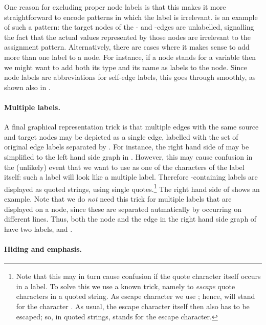 One reason for excluding proper node labels is that this makes it more
straightforward to encode patterns in which the label is irrelevant.
 is an example of such a pattern: the target nodes of the
\xx- and \yy-edges are unlabelled, signalling the fact that the actual values
represented by those nodes are irrelevant to the assignment
pattern. Alternatively, there are cases where it makes sense to add more than one label
to a node. For instance, if a node stands for a variable then we might want to
add both its type and its name as labels to the node. Since node labels are
abbreviations for self-edge labels, this goes through smoothly, as shown also
in .

\paragraph{Multiple labels.}

A final graphical representation trick is that multiple edges with the same
source and target nodes may be depicted as a single edge, labelled with the set
of original edge labels separated by \quo{\sepChar}. For instance, the right
hand side of  may be simplified to the left hand side
graph in . However, this may cause confusion in the
(unlikely) event that we want to use \quo{\sepChar} as one of the characters of
the label itself: such a label will look like a multiple label. Therefore
\quo{\sepChar}-containing labels are displayed as quoted strings, using single
quotes.\footnote{Note that this may in turn cause confusion if the quote
character itself occurs in a label. To solve this we use a known trick, namely
to \emph{escape} quote characters in a quoted string. As escape character we
use \quo\escChar; hence, \quo{\escChar\quoChar} will stand for the character
\quo\quoChar. As usual, the escape character itself then also has to be
escaped; so, in quoted strings, \quo{\escChar\escChar} stands for the escape
character.} The right hand side of  shows an example. Note
that we do \emph{not} need this trick for multiple labels that are displayed on
a node, since these are separated autmatically by occurring on different lines.
Thus, both the node and the edge in the right hand side graph of
 have two labels,  and .

%
%

\paragraph{Hiding and emphasis.}

